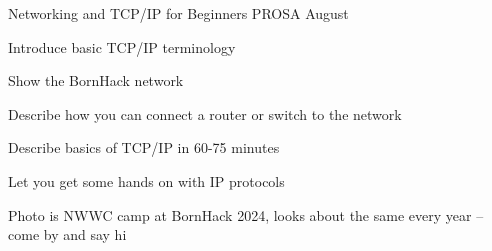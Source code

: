 \documentclass[Screen16to9,17pt]{foils}
\begin{document}
\mytitlepage
{Networking and TCP/IP for Beginners}
{PROSA August \the\year{}}


\hlkprofiluk



\begin{list2}
\item Introduce basic TCP/IP terminology
\item Show the BornHack network
\item Describe how you can connect a router or switch to the network
\item Describe basics of TCP/IP in 60-75 minutes
\item Let you get some hands on with IP protocols
\end{list2}

Photo is NWWC camp at BornHack 2024, looks about the same every year
--come by and say hi
\end{document}
